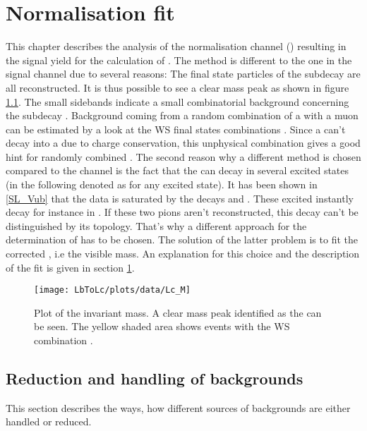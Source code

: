 \chapter{Normalisation fit}
\label{sec:Normalisationfit}
This chapter describes the analysis of the normalisation channel \LbToLcmunu (\LcTopKpi) resulting in the signal yield \NLc for the calculation of \R. The method is different to the one in the signal channel \LbToDpmunuX due to several reasons:
The final state particles of the subdecay \LcTopKpi are all reconstructed. 
It is thus possible to see a clear \Lc mass peak as shown in figure \ref{fig:plot_Lc_M}.
The small sidebands indicate a small combinatorial background concerning the subdecay \LcTopKpi.
Background coming from a random combination of a \Lc with a muon can be estimated by a look at the WS final states combinations \Lc\mup.
Since a \Lb can't decay into a \Lc\mup due to charge conservation, this unphysical combination gives a good hint for randomly combined \Lc\mun.
The second reason why a different method is chosen compared to the \LbToDpmunuX channel is the fact that the \Lb can decay in several excited \Lc states (in the following denoted as \Lcstar for any excited \Lc state).
It has been shown in \ref{SL_Vub} that the \LbToLcmunu data is saturated by the decays  and .
These excited \Lcstar instantly decay for instance in \Lc\pip\pim. 
If these two pions aren't reconstructed, this decay can't be distinguished by its topology.
That's why a different approach for the determination of \NLc has to be chosen.
The solution of the latter problem is to fit the corrected \pKpi\mun, i.e the visible \Lb mass.
An explanation for this choice and the description of the fit is given in section \ref{sec:Normalisationfit}.
\begin{figure}[hptb]
    \centering
	\texttt{[image: LbToLc/plots/data/Lc\_M]}	
	\caption{Plot of the invariant \pKpi mass. A clear mass peak identified as the \Lc can be seen. The yellow shaded area shows events with the WS combination \Lc\mup.}
	\label{fig:plot_Lc_M}
\end{figure}


\section{Reduction and handling of backgrounds}
This section describes the ways, how different sources of backgrounds are either handled or reduced.

